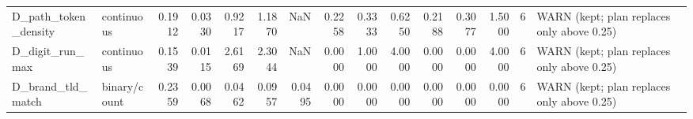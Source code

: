 \begin{tabular}{llrrrrrrrrrrrrl}
D\_path\_token\_density & continuous & 0.1912 & 0.0330 & 0.9217 & 1.1870 & NaN & 0.2258 & 0.3333 & 0.6250 & 0.2188 & 0.3077 & 1.5000 & 6 & WARN (kept; plan replaces only above 0.25) \\
D\_digit\_run\_max & continuous & 0.1539 & 0.0115 & 2.6169 & 2.3044 & NaN & 0.0000 & 1.0000 & 4.0000 & 0.0000 & 0.0000 & 4.0000 & 6 & WARN (kept; plan replaces only above 0.25) \\
D\_brand\_tld\_match & binary/count & 0.2359 & 0.0068 & 0.0462 & 0.0957 & 0.0495 & 0.0000 & 0.0000 & 0.0000 & 0.0000 & 0.0000 & 0.0000 & 6 & WARN (kept; plan replaces only above 0.25) \\
\bottomrule
\end{tabular}

